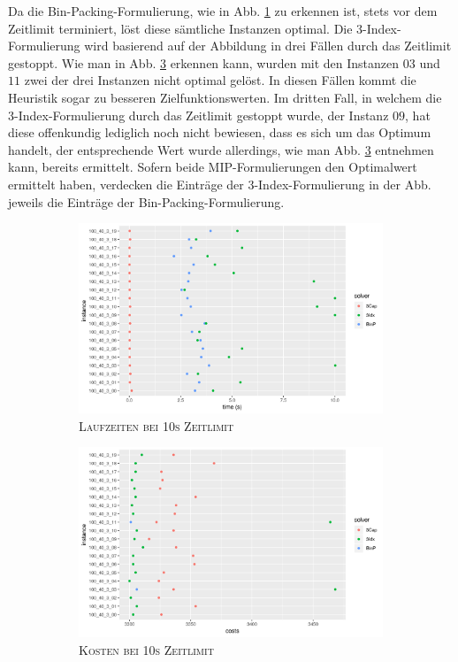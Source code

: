 Da die Bin-Packing-Formulierung, wie in Abb. \ref{fig:b=3_s_runtimes} zu erkennen ist, stets vor dem Zeitlimit terminiert,
löst diese sämtliche Instanzen optimal. Die 3-Index-Formulierung wird basierend auf der Abbildung in drei Fällen
durch das Zeitlimit gestoppt. Wie man in Abb. \ref{fig:b=3_s_costs} erkennen kann, wurden mit den
Instanzen $03$ und $11$ zwei der drei Instanzen nicht optimal gelöst.
In diesen Fällen kommt die Heuristik sogar zu besseren Zielfunktionswerten.
Im dritten Fall, in welchem die 3-Index-Formulierung durch das Zeitlimit gestoppt wurde, der Instanz $09$, hat diese
offenkundig lediglich noch nicht bewiesen, dass es sich um das Optimum handelt, der entsprechende Wert wurde allerdings,
wie man Abb. \ref{fig:b=3_s_costs} entnehmen kann, bereits ermittelt. Sofern beide MIP-Formulierungen den Optimalwert ermittelt haben,
verdecken die Einträge der 3-Index-Formulierung in der Abb. jeweils die Einträge der Bin-Packing-Formulierung.

\begin{figure}[H]
\centering
\begin{subfigure}[b]{0.4\textwidth}
\centering
\includegraphics[width=1.3\textwidth]{img/solver_instance_time_b=3_s_10s.png}
\caption{\textsc{Laufzeiten bei 10s Zeitlimit}}
\label{fig:b=3_s_runtimes}
\end{subfigure}
\hfill
\begin{subfigure}[b]{0.4\textwidth}
\centering
\includegraphics[width=1.3\textwidth]{img/solver_instance_cost_b=3_s_10s.png}
\caption{\textsc{Kosten bei 10s Zeitlimit}}
\label{fig:b=3_s_costs}
\end{subfigure}
\caption{}
\end{figure}

